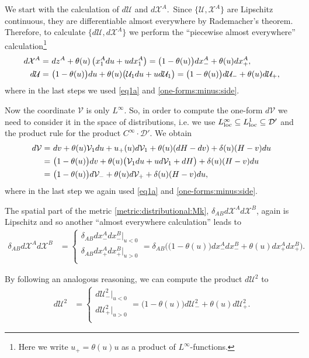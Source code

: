 \documentclass[11pt]{article}
\numberwithin{equation}{section}
\newcommand{\cx}{\mathcal{X}}
\newcommand{\nn}{\nonumber}
\newcommand{\lp}{\left(}
\newcommand{\rp}{\right)}
\newcommand{\cu}{\mathcal{U}}
\newcommand{\cv}{\mathcal{V}}
\newcommand{\lb}{\left\lbrace}
\newcommand{\rd}{\right.}
\newcommand{\spc}{\textup{ }}
\begin{document}
We start with the calculation of $d\cu$ and $d\cx^A$.\ Since 
$\{\cu,\cx^A\}$ are Lipschitz continuous, they are
differentiable almost everywhere by Rademacher's theorem.  
Therefore, to calculate $\{d\cu,d\cx^A\}$ we perform the ``piecewise almost everywhere'' calculation\footnote{Here we write $u_+=\theta(u)u$ as a product of $L^\infty$-functions.}
\begin{align}
\label{dcxA} d\cx^A=&\spc 
dz^A + \theta(u)\lp x_1^A du+udx^A_1 \rp 
= \big( 1-\theta(u)\big) dx_-^A + \theta(u) dx_+^A,\\
\label{dcu} d\cu=&\spc 
\big(1-\theta(u)\big) du +\theta(u)\big(\cu_1 du+ud\cu_1\big)=\big(1-\theta(u)\big)d\cu_-+\theta(u)d\cu_+,
\end{align}
where in the last steps we used \eqref{eq1a} and \eqref{one-forms:minus:side}.\ 

Now the coordinate $\cv$ is only $L^\infty$. So, in order to compute the one-form $d\cv$ we need to consider it in the space of distributions, i.e. we use $L^{\infty}_{\textup{loc}}\subseteq L^{1}_{\textup{loc}} \subseteq\mathcal{D}'$ and the product rule for the product $C^\infty\cdot\mathcal{D}'$. We obtain 
\begin{align}
\nn d\cv=&\spc dv+\theta(u) \cv_1 du +u_+(u)d\cv_1+\theta(u)(dH-dv)+\delta(u)(H-v)du\\
=&\spc \big(1-\theta(u)\big) dv+\theta(u)\big( \cv_1 du +ud\cv_1+dH\big)+\delta(u)(H-v)du\\
\label{dcv}=&\spc \big(1-\theta(u)\big) d\cv_-+\theta(u)d\cv_++\delta(u)(H-v)du,
\end{align} 
where in the last step we again used \eqref{eq1a} and \eqref{one-forms:minus:side}.

The spatial part of the metric \eqref{metric:distributional:Mk}, $\delta_{AB}d\cx^A d\cx^B$, again is Lipschitz and so another ``almost everywhere calculation'' leads to
\begin{align}
\label{dist:metric:term:1} \delta_{AB}d\cx^A d\cx^B&=\lb
\begin{array}{l}
\delta_{AB}dx_-^A dx_-^B\vert_{u<0}\\  
\delta_{AB} dx_+^A dx_+^B\vert_{u>0}  \\
\end{array}
\rd
=\delta_{AB}\Big( \big(1-\theta(u)\big)dx_-^Adx_-^B+\theta(u)dx_+^Adx_+^B\Big).
\end{align}

By following an analogous reasoning, we can compute the product $d\cu^2$ to
\begin{align}
\label{dcu:squared}d\cu^2&=\lb
\begin{array}{l}
d\cu_-^2\vert_{u<0}\\  
d\cu_+^2\vert_{u>0}  \\
\end{array}
\rd
= \big(1-\theta(u)\big)d\cu_-^2+\theta(u)d\cu_+^2.
\end{align}
\end{document}

